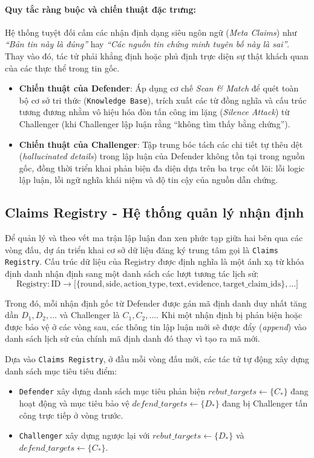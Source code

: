 \documentclass[12pt,a4paper]{report}
\begin{document}
\paragraph{Quy tắc ràng buộc và chiến thuật đặc trưng:} 
Hệ thống tuyệt đối cấm các nhận định dạng siêu ngôn ngữ (\textit{Meta Claims}) như \textit{``Bản tin này là đúng''} hay \textit{``Các nguồn tin chứng minh tuyên bố này là sai''}. Thay vào đó, tác tử phải khẳng định hoặc phủ định trực diện sự thật khách quan của các thực thể trong tin gốc.
\begin{itemize}
    \item \textbf{Chiến thuật của Defender}: Áp dụng cơ chế \textit{Scan \& Match} để quét toàn bộ cơ sở tri thức (\texttt{Knowledge Base}), trích xuất các từ đồng nghĩa và cấu trúc tương đương nhằm vô hiệu hóa đòn tấn công im lặng (\textit{Silence Attack}) từ Challenger (khi Challenger lập luận rằng ``không tìm thấy bằng chứng'').
    \item \textbf{Chiến thuật của Challenger}: Tập trung bóc tách các chi tiết tự thêu dệt (\textit{hallucinated details}) trong lập luận của Defender không tồn tại trong nguồn gốc, đồng thời triển khai phản biện đa diện dựa trên ba trục cốt lõi: lỗi logic lập luận, lỗi ngữ nghĩa khái niệm và độ tin cậy của nguồn dẫn chứng.
\end{itemize}

\subsection{Claims Registry - Hệ thống quản lý nhận định}
Để quản lý và theo vết ma trận lập luận đan xen phức tạp giữa hai bên qua các vòng đấu, dự án triển khai cơ sở dữ liệu đăng ký trung tâm gọi là \texttt{Claims Registry}. Cấu trúc dữ liệu của Registry được định nghĩa là một ánh xạ từ khóa định danh nhận định sang một danh sách các lượt tương tác lịch sử:
$$\text{Registry} \colon \text{ID} \to \big[ \{ \text{round}, \text{side}, \text{action\_type}, \text{text}, \text{evidence}, \text{target\_claim\_ids} \}, \dots \big]$$

Trong đó, mỗi nhận định gốc từ Defender được gán mã định danh duy nhất tăng dần $D_1, D_2, \dots$ và Challenger là $C_1, C_2, \dots$. Khi một nhận định bị phản biện hoặc được bảo vệ ở các vòng sau, các thông tin lập luận mới sẽ được đẩy (\textit{append}) vào danh sách lịch sử của chính mã định danh đó thay vì tạo ra mã mới. 

Dựa vào \texttt{Claims Registry}, ở đầu mỗi vòng đấu mới, các tác tử tự động xây dựng danh sách mục tiêu tiêu điểm:
\begin{itemize}
    \item \texttt{Defender} xây dựng danh sách mục tiêu phản biện $rebut\_targets \leftarrow \{C_*\}$ đang hoạt động và mục tiêu bảo vệ $defend\_targets \leftarrow \{D_*\}$ đang bị Challenger tấn công trực tiếp ở vòng trước.
    \item \texttt{Challenger} xây dựng ngược lại với $rebut\_targets \leftarrow \{D_*\}$ và $defend\_targets \leftarrow \{C_*\}$.
\end{itemize}
\end{document}
